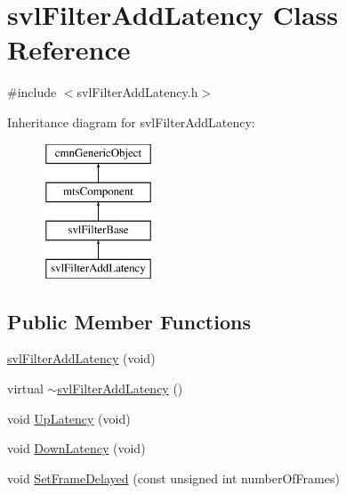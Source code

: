 \hypertarget{classsvl_filter_add_latency}{}\section{svl\+Filter\+Add\+Latency Class Reference}
\label{classsvl_filter_add_latency}


{\ttfamily \#include $<$svl\+Filter\+Add\+Latency.\+h$>$}

Inheritance diagram for svl\+Filter\+Add\+Latency\+:\begin{figure}[H]
\begin{center}
\leavevmode
\includegraphics[height=4.000000cm]{d1/d9c/classsvl_filter_add_latency}
\end{center}
\end{figure}
\subsection*{Public Member Functions}
\begin{DoxyCompactItemize}
\item 
\hyperlink{classsvl_filter_add_latency_a8a35f064afd54f5e79a83e7325991f47}{svl\+Filter\+Add\+Latency} (void)
\item 
virtual \hyperlink{classsvl_filter_add_latency_a00b6253e53e92f5904374de49de3d6f2}{$\sim$svl\+Filter\+Add\+Latency} ()
\item 
void \hyperlink{classsvl_filter_add_latency_a5762a25ca96b3348737b826c9bacfd84}{Up\+Latency} (void)
\item 
void \hyperlink{classsvl_filter_add_latency_a37f482dc4b5cb281143f035ac0ee7015}{Down\+Latency} (void)
\item 
void \hyperlink{classsvl_filter_add_latency_ae6279a563cfb972897ac1c1798a95183}{Set\+Frame\+Delayed} (const unsigned int number\+Of\+Frames)
\end{DoxyCompactItemize}
